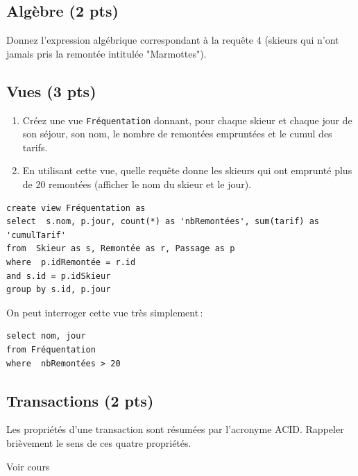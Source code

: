 \subsection*{Algèbre (2 pts)}

Donnez l'expression algébrique correspondant 
à la requête 4 (skieurs qui 
n'ont jamais pris la remontée intitulée "Marmottes").


\subsection*{Vues (3 pts)}

\begin{enumerate}
   \item Créez une vue \texttt{Fréquentation} donnant,  pour chaque skieur
        et chaque jour de son séjour, son nom, 
       le nombre de remontées empruntées et le cumul des tarifs.
     
      \item En utilisant cette vue, quelle requête donne les skieurs
        qui ont emprunté plus de 20 remontées (afficher 
        le nom du skieur et le jour).
\end{enumerate}

\begin{solution}

\begin{verbatim}
create view Fréquentation as
select  s.nom, p.jour, count(*) as 'nbRemontées', sum(tarif) as 'cumulTarif'
from  Skieur as s, Remontée as r, Passage as p
where  p.idRemontée = r.id
and s.id = p.idSkieur
group by s.id, p.jour
\end{verbatim}

On peut interroger cette vue très simplement\,:
\begin{verbatim}
select nom, jour
from Fréquentation
where  nbRemontées > 20
\end{verbatim}

\end{solution}

\subsection*{Transactions (2 pts)}

Les propriétés d'une transaction sont résumées 
par l'acronyme ACID. Rappeler brièvement le sens de
ces quatre propriétés.


\begin{solution}
Voir cours
\end{solution}



